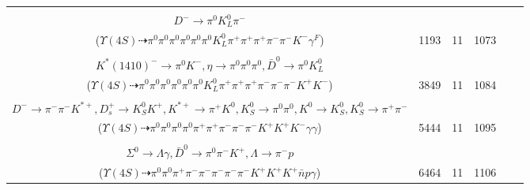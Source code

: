 \documentclass[landscape]{article}
\newcounter{rownumbers}
\newcommand\rn{\stepcounter{rownumbers}\arabic{rownumbers}}
\newcommand{\EOLP}{\\ \hline} %
\newcommand{\topoTags}[1]{#1} %
\begin{document}
\begin{longtable}{clcccc}
\rn & \makecell[l]{ $ 
\Upsilon(4S) \rightarrow B^{0} \bar{B}^{0} ,
B^{0} \rightarrow \pi^{+} \eta \omega D^{*-} ,
\bar{B}^{0} \rightarrow \pi^{+} K^{-} \gamma^{F} ,
\eta \rightarrow \pi^{0} \pi^{0} \pi^{0} ,
\omega \rightarrow \pi^{0} \pi^{+} \pi^{-} ,
D^{*-} \rightarrow \pi^{0} D^{-} ,
$ \\ $
D^{-} \rightarrow \pi^{0} K_{L}^{0} \pi^{-} 
$ \\ ($
\Upsilon(4S) \dashrightarrow \pi^{0} \pi^{0} \pi^{0} \pi^{0} \pi^{0} \pi^{0} K_{L}^{0} \pi^{+} \pi^{+} \pi^{+} \pi^{-} \pi^{-} K^{-} \gamma^{F} 
$) } & \topoTags{1193 & }11 & 1073 \EOLP

\rn & \makecell[l]{ $ 
\Upsilon(4S) \rightarrow B^{0} \bar{B}^{0} ,
B^{0} \rightarrow K^{*} D^{+} D^{*-} ,
\bar{B}^{0} \rightarrow \pi^{+} K^{*}(1410)^{-} ,
K^{*} \rightarrow \pi^{-} K^{+} ,
D^{+} \rightarrow \pi^{0} \pi^{+} \pi^{+} \pi^{-} \eta ,
D^{*-} \rightarrow \pi^{-} \bar{D}^{0} ,
$ \\ $
K^{*}(1410)^{-} \rightarrow \pi^{0} K^{-} ,
\eta \rightarrow \pi^{0} \pi^{0} \pi^{0} ,
\bar{D}^{0} \rightarrow \pi^{0} K_{L}^{0} 
$ \\ ($
\Upsilon(4S) \dashrightarrow \pi^{0} \pi^{0} \pi^{0} \pi^{0} \pi^{0} \pi^{0} K_{L}^{0} \pi^{+} \pi^{+} \pi^{+} \pi^{-} \pi^{-} \pi^{-} K^{+} K^{-} 
$) } & \topoTags{3849 & }11 & 1084 \EOLP

\rn & \makecell[l]{ $ 
\Upsilon(4S) \rightarrow B^{0} B^{0} ,
B^{0} \rightarrow K^{-} K^{*+} ,
B^{0} \rightarrow D^{*-} D_{s1}^{\prime+} \gamma ,
K^{*+} \rightarrow \pi^{0} K^{+} ,
D^{*-} \rightarrow \pi^{0} D^{-} ,
D_{s1}^{\prime+} \rightarrow D_{s}^{+} \gamma ,
$ \\ $
D^{-} \rightarrow \pi^{-} \pi^{-} K^{*+} ,
D_{s}^{+} \rightarrow K_{S}^{0} K^{+} ,
K^{*+} \rightarrow \pi^{+} K^{0} ,
K_{S}^{0} \rightarrow \pi^{0} \pi^{0} ,
K^{0} \rightarrow K_{S}^{0} ,
K_{S}^{0} \rightarrow \pi^{+} \pi^{-} 
$ \\ ($
\Upsilon(4S) \dashrightarrow \pi^{0} \pi^{0} \pi^{0} \pi^{0} \pi^{+} \pi^{+} \pi^{-} \pi^{-} \pi^{-} K^{+} K^{+} K^{-} \gamma \gamma 
$) } & \topoTags{5444 & }11 & 1095 \EOLP

\rn & \makecell[l]{ $ 
\Upsilon(4S) \rightarrow B^{0} B^{0} ,
B^{0} \rightarrow \rho^{-} K^{+} ,
B^{0} \rightarrow \pi^{-} K^{+} D^{*-} \bar{\Sigma}^{+} \Sigma^{0} ,
\rho^{-} \rightarrow \pi^{0} \pi^{-} ,
D^{*-} \rightarrow \pi^{-} \bar{D}^{0} ,
\bar{\Sigma}^{+} \rightarrow \pi^{+} \bar{n} ,
$ \\ $
\Sigma^{0} \rightarrow \Lambda \gamma ,
\bar{D}^{0} \rightarrow \pi^{0} \pi^{-} K^{+} ,
\Lambda \rightarrow \pi^{-} p 
$ \\ ($
\Upsilon(4S) \dashrightarrow \pi^{0} \pi^{0} \pi^{+} \pi^{-} \pi^{-} \pi^{-} \pi^{-} \pi^{-} K^{+} K^{+} K^{+} \bar{n} p \gamma 
$) } & \topoTags{6464 & }11 & 1106 \EOLP


\end{longtable}
\end{document}

